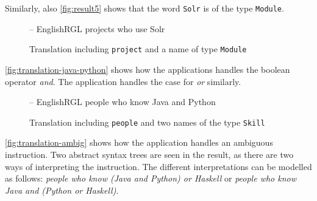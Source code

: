 Similarly, also \autoref{fig:result5} shows that the word \texttt{Solr} is of the type \texttt{Module}.

\begin{figure}[H]
\begin{terminal}
-- EnglishRGL
projects who use Solr
\end{terminal}
\begin{json-small}
\end{json-small}
\caption{Translation including \texttt{project} and a name of type \texttt{Module}\label{fig:result5}}
\end{figure}

\autoref{fig:translation-java-python} shows how the applications handles the boolean operator \emph{and}. The application handles the case for \emph{or} similarly.

\begin{figure}[H]
\begin{terminal}
-- EnglishRGL
people who know Java and Python
\end{terminal}
\begin{json-small}
\end{json-small}
\caption{Translation including \texttt{people} and two names of the type \texttt{Skill}\label{fig:translation-java-python}}
\end{figure}

\autoref{fig:translation-ambig} shows how the application handles an ambiguous instruction. Two abstract syntax trees are seen in the result, as there are two ways of interpreting the instruction. The different interpretations can be modelled as follows: \emph{people who know (Java and Python) or Haskell} or \emph{people who know Java and (Python or Haskell)}.

